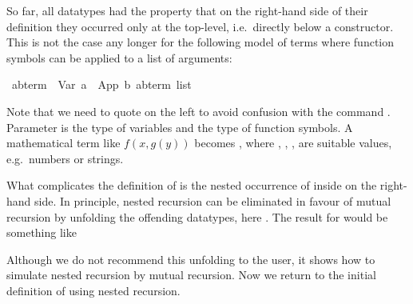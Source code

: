 %
\begin{isabellebody}%
\def\isabellecontext{Nested}%
%
\begin{isamarkuptext}%
So far, all datatypes had the property that on the right-hand side of their
definition they occurred only at the top-level, i.e.\ directly below a
constructor. This is not the case any longer for the following model of terms
where function symbols can be applied to a list of arguments:%
\end{isamarkuptext}%
\ {\isacharparenleft}{\isacharprime}a{\isacharcomma}{\isacharprime}b{\isacharparenright}{\isachardoublequote}term{\isachardoublequote}\ {\isacharequal}\ Var\ {\isacharprime}a\ {\isacharbar}\ App\ {\isacharprime}b\ {\isachardoublequote}{\isacharparenleft}{\isacharprime}a{\isacharcomma}{\isacharprime}b{\isacharparenright}term\ list{\isachardoublequote}%
\begin{isamarkuptext}%
\noindent
Note that we need to quote  on the left to avoid confusion with
the command .
Parameter  is the type of variables and  the type of
function symbols.
A mathematical term like $f(x,g(y))$ becomes , where , , ,  are
suitable values, e.g.\ numbers or strings.

What complicates the definition of  is the nested occurrence of
 inside  on the right-hand side. In principle,
nested recursion can be eliminated in favour of mutual recursion by unfolding
the offending datatypes, here . The result for 
would be something like
\medskip


\medskip

\noindent
Although we do not recommend this unfolding to the user, it shows how to
simulate nested recursion by mutual recursion.
Now we return to the initial definition of  using
nested recursion.


\end{isamarkuptext}
\end{isabellebody}
